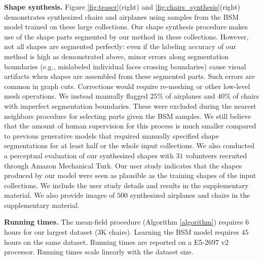 \textbf{Shape synthesis.} Figure \ref{fig:teaser}(right) and \ref{fig:chairs_synthesis}(right) demonstrates synthesized chairs and airplanes using samples from the BSM model trained on these large collections. Our shape synthesis procedure makes use of the shape parts segmented by our method in these collections. However, not all shapes are segmented perfectly: even if the labeling accuracy of our method is high as demonstrated above, minor errors along segmentation boundaries (e.g., mislabeled individual faces crossing boundaries) cause visual artifacts when shapes are assembled from these segmented parts. Such errors are common in graph cuts. Corrections would require re-meshing or other low-level mesh operations. We instead manually flagged $25\%$ of airplanes and $40\%$ of chairs with imperfect segmentation boundaries. These were excluded during the nearest neighbors procedure for selecting parts given the BSM samples. We still believe that the amount of human supervision for this process is much smaller compared to previous generative models \cite{Kalogerakis12} that required manually specified shape segmentations for at least half or the whole input collections. We also conducted a perceptual evaluation of our synthesized shapes with $31$ volunteers recruited through Amazon Mechanical Turk. Our user study indicates that the shapes produced by our model were seen as plausible as the training shapes of the input collections. We include the user study details and results in the supplementary material. We also provide images of $500$ synthesized airplanes and chairs in the supplementary material.   

\textbf{Running times.} The mean-field procedure (Algorithm \ref{algorithm}) requires $6$ hours for our largest dataset (3K chairs). Learning the BSM model requires $45$ hours on the same dataset. Running times are reported on a E5-2697 v2 processor. Running times scale linearly with the dataset size.

\vspace{-2mm}



